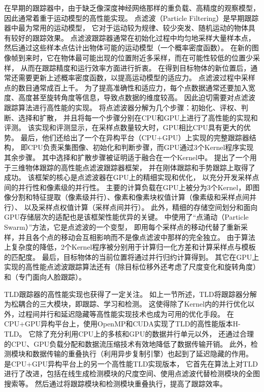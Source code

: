 在早期的跟踪器中，由于缺乏像深度神经网络那样的重负载、高精度的观察模型，
因此通常着重于运动模型的高性能实现。
点滤波（Particle Filtering）是早期跟踪器中最为常用的运动模型，
它对于运动较为规律、较少突发、随机运动的物体具有较好的跟踪效果。
点滤波跟踪器通常在初始化过程中均匀地采样大量样本点，然后通过这些样本点估计出物体可能的运动模型（一个概率密度函数）。
在新的图像帧到来时，它在物体最可能出现的位置附近多采样，而在可能性较低的位置少采样，
从而在跟踪精度和运行效率方面进行折衷。
在得到目标物体的新位置后，通常还需要更新上述概率密度函数，以提高运动模型的适应力。
点滤波过程中采样点的数目通常成百上千。
为了提高准确性和适应力，每个点数据通常还要加入宽度、高度甚至旋转角度等信息，导致点数据的维度较高。
因此迫切需要对点滤波跟踪算法进行高性能的实现。
\cite{Concha2014}将点滤波器分解为几个步骤：初始化、评权、判断、选择和扩散，
并且将每一个步骤分别在CPU和GPU上进行了高性能的实现和评测。
该实现和评测显示，在采样点数量较大时，GPU相比CPU具有更大的优势。
最后，他们还给出了一个在异构平台（CPU+GPU）上实现的完整跟踪器结构，
即CPU负责采集图像、初始化和判断步骤，而GPU通过3个Kernel程序实现其余步骤。
其中选择和扩散步骤被证明适于融合在一个Kernel中。
\cite{Brown2012}提出了一个用于三维物体跟踪的高性能点滤波跟踪器框架，
并在刚体跟踪和手势跟踪上取得了成功。
该框架的核心是点滤波器在GPU上的精细实现和优化，
以充分开发采样点间的并行性和像素级的并行性。
主要的计算负载在GPU上被分为3个Kernel，即图像分割和特征提取（像素级并行）、像素和像素块权值计算（像素级和采样点间并行）、
以及采样点权值计算（采样点间并行）。
此外，精细的存储空间划分和面向GPU存储层次的适配也是该框架性能优异的关键。
\cite{Rymut2010}中使用了“点涌动（Particle Swarm）”方法，它是点滤波的一个变型，
即用每个采样点的移动代替了重新采样，并且各个点的移动会互相影响而不是像点滤波中那样的完全独立。
由于算法上复杂度的降低，2个Kernel程序被分别用于计算归一化方差和计算采样点与模板的匹配度。
最后，目标物体的当前位置将通过并行归约计算得到。
其它在GPU上实现的高性能点滤波跟踪算法还有\cite{Cabido2012}（除目标位移外还考虑了尺度变化和旋转角度）
和\cite{Lozano2009}（专门面向人脸跟踪）。

TLD跟踪器的高性能实现也获得了一定关注。
如上一节所述，TLD将跟踪器分解为松耦合的三大模块，即跟踪、学习和检测。
这使得除了Kernel内的并行优化以外，过程间并行和延迟隐藏等高性能实现技术也成为可用的优化手段。
\cite{htld}在CPU+GPU异构平台上，使用OpenMP和CUDA实现了TLD的高性能版本\pozhehao H-TLD。
它除了充分利用CPU上的多核和GPU的数据并行单元以外，
还通过合理的CPU、GPU负载分配和数据流压缩技术有效地降低了数据传输开销。
此外，检测模块和数据传输的重叠执行（利用异步复制引擎）也起到了延迟隐藏的作用。
\cite{Pengyu2013}是CPU+GPU异构平台上的另一个高性能TLD实现版本，
它首先在算法上对TLD进行了改进，包括在线生成检测模块的尺度空间、使用点滤波代替检测模块的全图搜索等。
然后通过将跟踪模块和检测模块重叠执行，提高了跟踪效率。



